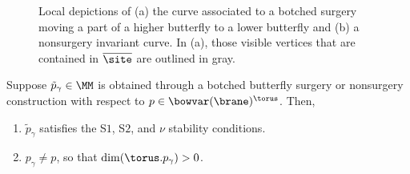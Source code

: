 \begin{figure}[t]
{
}

\caption{Local depictions of (a) the curve associated to a botched surgery moving a part of a higher butterfly to a lower butterfly and (b) a nonsurgery invariant curve. In (a), those visible vertices that are contained in $\overline\site$ are outlined in gray.}
\label{fig:special_curves}
\end{figure}

\begin{Lemma} \label{lemma:type23_curve}
Suppose $\tilde{p}_\gamma \in \MM$ is obtained through a botched butterfly surgery or nonsurgery construction with respect to $p \in \bowvar(\brane)^\torus$. Then,
\begin{enumerate}\itemsep=0pt
\item[$(1)$] $\tilde{p}_\gamma$ satisfies the S$1$, S$2$, and $\nu$ stability conditions.
\item[$(2)$] $p_\gamma \neq p$, so that $\dim(\torus.p_\gamma) > 0$.
\end{enumerate}
\end{Lemma}

